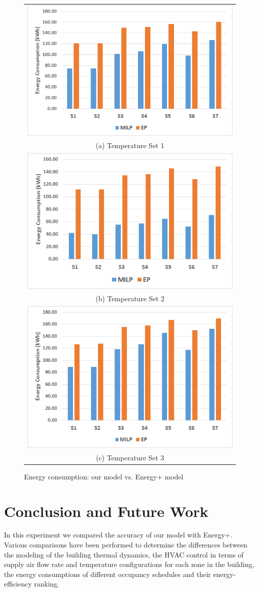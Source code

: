 \begin{figure} [h]
\vspace*{-2ex}
\centering
\begin{tabular}{c}
  \includegraphics[width=0.47\linewidth]{figs/app_sche_D7-12.png} \\
(a) Temperature Set 1 \\
  \includegraphics[width=0.47\linewidth]{figs/app_sche_D14-19.png} \\
(b) Temperature Set 2 \\
	\includegraphics[width=0.47\linewidth]{figs/app_sche_D21-26.png} \\
(c) Temperature Set 3 \\
\end{tabular}
\caption{Energy consumption: our model vs. Energy+ model}
\label{fig:compare_sche}
\vspace*{-2ex}
\end{figure}

\section{Conclusion and Future Work}

In this experiment we compared the accuracy of our model with Energy+. Various comparisons have been performed to determine the differences between the modeling of the building thermal dynamics, the HVAC control in terms of supply air flow rate and temperature configurations for each zone in the building, the energy consumptions of different occupancy schedules and their energy-efficiency ranking.


